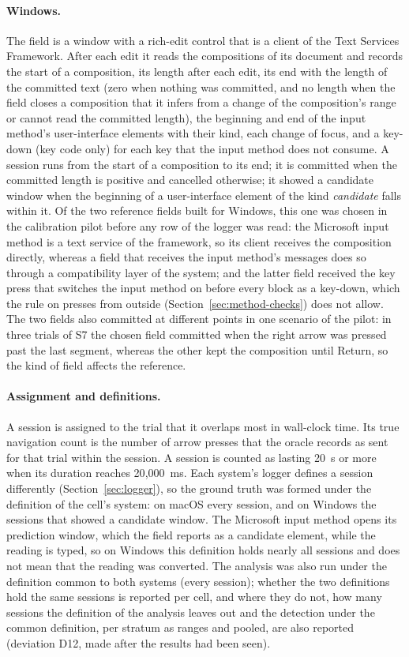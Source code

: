 \paragraph{Windows.} The field is a window with a rich-edit control that is a client of the Text Services Framework.
After each edit it reads the compositions of its document and records the start of a composition, its length after
each edit, its end with the length of the committed text (zero when nothing was committed, and no length when the
field closes a composition that it infers from a change of the composition's range or cannot read the committed
length), the beginning and end of the input method's user-interface elements with their kind, each change of focus,
and a key-down (key code only) for each key that the input method does not consume. A session runs from the start of
a composition to its end; it is committed when the committed length is positive and cancelled otherwise; it showed a
candidate window when the beginning of a user-interface element of the kind \emph{candidate} falls within it. Of the
two reference fields built for Windows, this one was chosen in the calibration pilot before any row of the logger was
read: the Microsoft input method is a text service of the framework, so its client receives the composition directly,
whereas a field that receives the input method's messages does so through a compatibility layer of the system; and
the latter field received the key press that switches the input method on before every block as a key-down, which
the rule on presses from outside (Section~\ref{sec:method-checks}) does not allow. The two fields also committed at
different points in one scenario of the pilot: in three trials of S7 the chosen field committed when the right arrow
was pressed past the last segment, whereas the other kept the composition until Return, so the kind of field affects
the reference.

\paragraph{Assignment and definitions.} A session is assigned to the trial that it overlaps most in wall-clock time.
Its true navigation count is the number of arrow presses that the oracle records as sent for that trial within the
session. A session is counted as lasting 20~s or more when its duration reaches 20{,}000~ms. Each system's logger
defines a session differently (Section~\ref{sec:logger}), so the ground truth was formed under the definition of the
cell's system: on macOS every session, and on Windows the sessions that showed a candidate window. The Microsoft input
method opens its prediction window, which the field reports as a candidate element, while the reading is typed, so on
Windows this definition holds nearly all sessions and does not mean that the reading was converted. The analysis was
also run under the definition common to both systems (every session); whether the two definitions hold the same
sessions is reported per cell, and where they do not, how many sessions the definition of the analysis leaves out and
the detection under the common definition, per stratum as ranges and pooled, are also reported (deviation D12, made
after the results had been seen).

